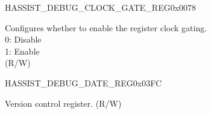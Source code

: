 \begin{register}{H}{ASSIST\_DEBUG\_CLOCK\_GATE\_REG}{0x0078}\label{regdesc:ASSISTDEBUGCLOCKGATEREG}
%
%
\regnewline%
\begin{regdesc}\begin{reglist}
\label{fielddesc:ASSISTDEBUGCLKEN}\item [ASSIST\_DEBUG\_CLK\_EN] Configures whether to enable the register clock gating. \\
0: Disable\\
1: Enable\\
(R/W)
\end{reglist}\end{regdesc}
\end{register}

\begin{register}{H}{ASSIST\_DEBUG\_DATE\_REG}{0x03FC}\label{regdesc:ASSISTDEBUGDATEREG}
%
%
\regnewline%
\begin{regdesc}\begin{reglist}
\label{fielddesc:ASSISTDEBUGDATE}\item [ASSIST\_DEBUG\_DATE] Version control register. (R/W)
\end{reglist}\end{regdesc}
\end{register}


